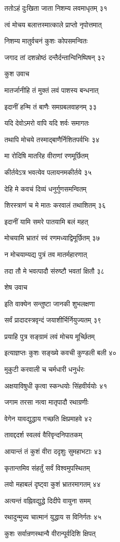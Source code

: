 ततोऽहं दुःखिता जाता निशम्य लवमाधृतम् ३१

त्वं मोचय बलात्तस्मात्काले प्राप्तो नृपोत्तमात्

निशम्य मातुर्वचनं कुशः कोपसमन्वितः

जगाद तां दशन्नोष्ठं दन्तैर्दन्तान्विनिष्पिषन् ३२

कुश उवाच

मातर्जानीहि तं मुक्तं लवं पाशस्य बन्धनात्

इदानीं हन्मि तं बाणैः समग्रबलवाहनम् ३३

यदि देवोऽमरो वापि यदि शर्वः समागतः

तथापि मोचये तस्माद्बाणैर्निशितपर्वभिः ३४

मा रोदिषि मातरिह वीराणां रणमूर्छितम्

कीर्तयेऽत्र भवत्येव पलायनमकीर्तये ३५

देहि मे कवचं दिव्यं धनुर्गुणसमन्वितम्

शिरस्त्राणं च मे मातः करवालं तथाशितम् ३६

इदानीं यामि समरे पातयामि बलं महत्

मोचयामि भ्रातरं स्वं रणमध्याद्विमूर्छितम् ३७

न मोचयाम्यद्य पुत्रं तव मातर्महारणात्

तदा तौ मे भवत्पादौ संरुष्टौ भवतां क्षितौ ३८

शेष उवाच

इति वाक्येन सन्तुष्टा जानकी शुभलक्षणा

सर्वं प्रादादस्त्रवृन्दं जयाशीर्भिर्नियुज्यतम् ३९

प्रयाहि पुत्र सङ्ग्रामं लवं मोचय मूर्च्छितम्

इत्याज्ञप्तः कुशः सङ्ख्ये कवची कुण्डली बली ४०

मुकुटी करवाली च चर्मधारी धनुर्धरः

अक्षयाविषुधी कृत्वा स्कन्धयोः सिंहवीर्ययोः ४१

जगाम तरसा नत्वा मातृपादौ रथाग्रणीः

वेगेन यावद्युद्धाय गच्छति क्षिप्रमाहवे ४२

तावद्ददर्श स्वलवं वैरिवृन्दनिपातकम्

आयान्तं तं कुशं वीरा ददृशुः सुमहाभटाः ४३

कृतान्तमिव संहर्तुं सर्वं विश्वमुपस्थितम्

लवो महाबलं दृष्ट्वा कुशं भ्रातरमागतम् ४४

अत्यन्तं वह्निवद्युद्धे दिदीपे वायुना समम्

रथादुन्मुच्य चात्मानं युद्धाय स विनिर्गतः ४५

कुशः सर्वान्रणस्थान्वै वीरान्पूर्वदिशि क्षिपत्

